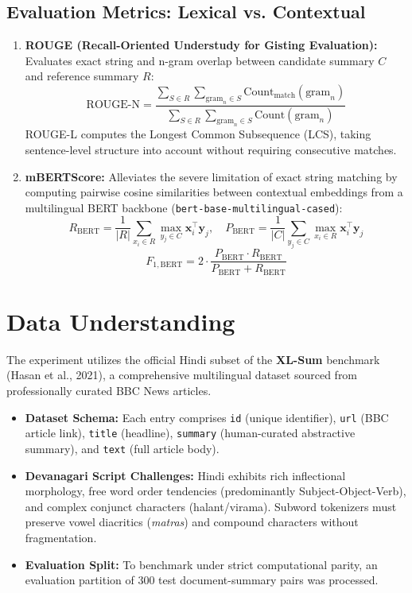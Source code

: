 \subsection{Evaluation Metrics: Lexical vs. Contextual}
\begin{enumerate}
    \item \textbf{ROUGE (Recall-Oriented Understudy for Gisting Evaluation):} Evaluates exact string and n-gram overlap between candidate summary $C$ and reference summary $R$:
    \begin{equation}
        \text{ROUGE-N} = \frac{\sum_{S \in R} \sum_{\text{gram}_n \in S} \text{Count}_{\text{match}}(\text{gram}_n)}{\sum_{S \in R} \sum_{\text{gram}_n \in S} \text{Count}(\text{gram}_n)}
    \end{equation}
    ROUGE-L computes the Longest Common Subsequence (LCS), taking sentence-level structure into account without requiring consecutive matches.
    \item \textbf{mBERTScore:} Alleviates the severe limitation of exact string matching by computing pairwise cosine similarities between contextual embeddings from a multilingual BERT backbone (\texttt{bert-base-multilingual-cased}):
    \begin{equation}
        R_{\text{BERT}} = \frac{1}{|R|} \sum_{x_i \in R} \max_{y_j \in C} \mathbf{x}_i^\top \mathbf{y}_j, \quad P_{\text{BERT}} = \frac{1}{|C|} \sum_{y_j \in C} \max_{x_i \in R} \mathbf{x}_i^\top \mathbf{y}_j
    \end{equation}
    \begin{equation}
        F_{1, \text{BERT}} = 2 \cdot \frac{P_{\text{BERT}} \cdot R_{\text{BERT}}}{P_{\text{BERT}} + R_{\text{BERT}}}
    \end{equation}
\end{enumerate}

\section{Data Understanding}
The experiment utilizes the official Hindi subset of the \textbf{XL-Sum} benchmark (Hasan et al., 2021), a comprehensive multilingual dataset sourced from professionally curated BBC News articles.
\begin{itemize}
    \item \textbf{Dataset Schema:} Each entry comprises \texttt{id} (unique identifier), \texttt{url} (BBC article link), \texttt{title} (headline), \texttt{summary} (human-curated abstractive summary), and \texttt{text} (full article body).
    \item \textbf{Devanagari Script Challenges:} Hindi exhibits rich inflectional morphology, free word order tendencies (predominantly Subject-Object-Verb), and complex conjunct characters (halant/virama). Subword tokenizers must preserve vowel diacritics (\textit{matras}) and compound characters without fragmentation.
    \item \textbf{Evaluation Split:} To benchmark under strict computational parity, an evaluation partition of 300 test document-summary pairs was processed.
\end{itemize}

